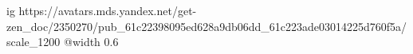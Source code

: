  
 
 
 
 

\ifcmt
  ig https://avatars.mds.yandex.net/get-zen_doc/2350270/pub_61c22398095ed628a9db06dd_61c223ade03014225d760f5a/scale_1200
  @width 0.6
\fi
